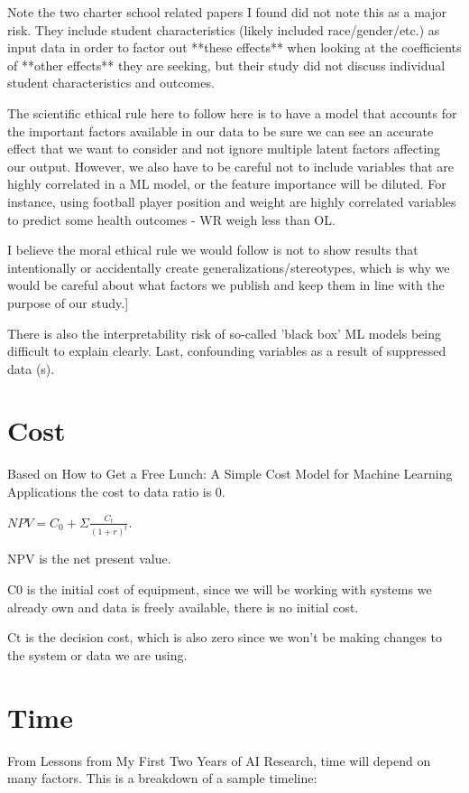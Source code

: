 \documentclass[sigconf,nonacm,11pt]{acmart}
\begin{document}
Note the two charter school related papers I found did not note this as a major risk. They include student characteristics (likely included race/gender/etc.) as input data in order to factor out **these effects** when looking at the coefficients of **other effects** they are seeking, but their study did not discuss individual student characteristics and outcomes.

The scientific ethical rule here to follow here is to have a model that accounts for the important factors available in our data to be sure we can see an accurate effect that we want to consider and not ignore multiple latent factors affecting our output. However, we also have to be careful not to include variables that are highly correlated in a ML model, or the feature importance will be diluted. For instance, using football player position and weight are highly correlated variables to predict some health outcomes - WR weigh less than OL.

I believe the moral ethical rule we would follow is not to show results that intentionally or accidentally create generalizations/stereotypes, which is why we would be careful about what factors we publish and keep them in line with the purpose of our study.]

There is also the interpretability risk of so-called 'black box' ML models being difficult to explain clearly.  Last, confounding variables as a result of suppressed data (s).

\section{Cost}
Based on How to Get a Free Lunch: A Simple Cost Model for Machine Learning Applications the cost to data ratio is 0.  

$NPV = C_0 + \Sigma{\frac{C_t}{(1+r)^t}}$. 

NPV is the net present value. 

C0 is the initial cost of equipment, since we will be working with systems we already own and data is freely available, there is no initial cost.  

Ct is the decision cost, which is also zero since we won’t be making changes to the system or data we are using. 


\section{Time}
From Lessons from My First Two Years of AI Research, time will depend on many factors. This is a breakdown of a sample timeline:
\end{document}
